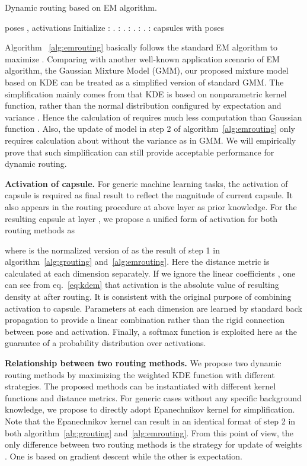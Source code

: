 \documentclass[runningheads]{llncs}
\begin{document}
\begin{algorithm}
  \caption{Dynamic routing based on EM algorithm.}
  \label{alg:emrouting}
  \begin{algorithmic}
   \REQUIRE poses , activations 
   \STATE Initialize : 
   . : 
   . : 
   . : 
   . : 
   \ENDFOR
   \RETURN capsules with poses 
  \end{algorithmic}
\end{algorithm}

Algorithm ~\ref{alg:emrouting} basically follows the standard EM algorithm to maximize . Comparing with another well-known application scenario of EM algorithm, the Gaussian Mixture Model (GMM), our proposed mixture model based on KDE can be treated as a simplified version of standard GMM. The simplification mainly comes from that KDE is based on nonparametric kernel function, rather than the normal distribution configured by expectation  and variance . Hence the calculation of  requires much less computation than Gaussian function . Also, the update of model in step 2 of algorithm~\ref{alg:emrouting} only requires calculation about  without the variance  as in GMM. We will empirically prove that such simplification can still provide acceptable performance for dynamic routing.

\textbf{Activation of capsule.} For generic machine learning tasks, the activation of capsule is required as final result to reflect the magnitude of current capsule. It also appears in the routing procedure at above layer as prior knowledge. For the resulting capsule at layer , we propose a unified form of activation  for both routing methods as

where  is the normalized version of  as the result of step 1 in algorithm~\ref{alg:grouting} and~\ref{alg:emrouting}. Here the distance metric is calculated at each dimension  separately. If we ignore the linear coefficients , one can see from eq.~\ref{eq:kdem} that activation is the absolute value of resulting density at  after routing. It is consistent with the original purpose of combining activation to capsule. Parameters  at each dimension are learned by standard back propagation to provide a linear combination rather than the rigid connection between pose and activation. Finally, a softmax function is exploited here as the guarantee of a probability distribution over activations.

\textbf{Relationship between two routing methods.} We propose two dynamic routing methods by maximizing the weighted KDE function  with different strategies. The proposed methods can be instantiated with different kernel functions and distance metrics. For generic cases without any specific background knowledge, we propose to directly adopt Epanechnikov kernel for simplification. Note that the Epanechnikov kernel can result in an identical format of step 2 in both algorithm~\ref{alg:grouting} and~\ref{alg:emrouting}. From this point of view, the only difference between two routing methods is the strategy for update of weights . One is based on gradient descent while the other is expectation.
\end{document}
